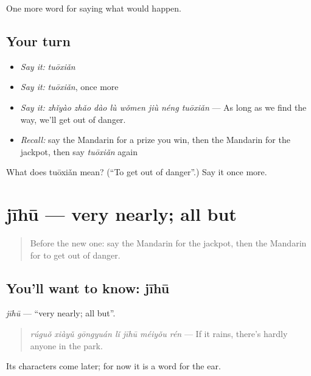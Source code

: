 \begin{grammarlens}[title={What you've built}]
One more word for saying what would happen.
\end{grammarlens}

\subsection*{Your turn}
\begin{itemize}
\raggedright
  \item \emph{Say it:} \emph{tuōxiǎn}
  \item \emph{Say it:} \emph{tuōxiǎn}, once more
  \item \emph{Say it:} \emph{zhǐyào zhǎo dào lù wǒmen jiù néng tuōxiǎn} — As long as we find the way, we'll get out of danger.
  \item \emph{Recall:} say the Mandarin for a prize you win, then the Mandarin for the jackpot, then say \emph{tuōxiǎn} again
\end{itemize}

\begin{tcolorbox}[breakable,colback=teal!4,colframe=teal!35!black,title={Before you move on}]
What does tuōxiǎn mean? (\textquotedblleft{}To get out of danger\textquotedblright{}.) Say it once more.
\end{tcolorbox}
\section[jīhū]{jīhū — very nearly; all but}

\label{lesson:ZH-C531-jihu}



\begin{quote}
Before the new one: say the Mandarin for the jackpot, then the Mandarin for to get out of danger.
\end{quote}

\subsection*{You'll want to know: jīhū}
\emph{jīhū} — \textquotedblleft{}very nearly; all but\textquotedblright{}.

\begin{quote}
\emph{rúguǒ xiàyǔ gōngyuán lǐ jīhū méiyǒu rén} — If it rains, there's hardly anyone in the park.
\end{quote}

Its characters come later; for now it is a word for the ear.

